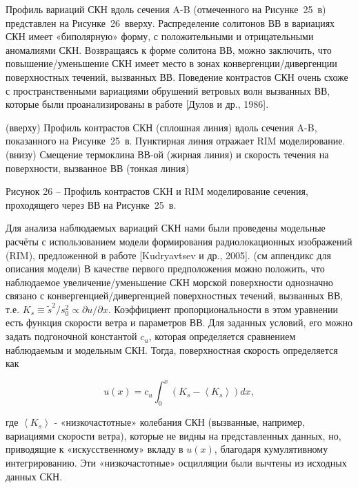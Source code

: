 Профиль вариаций СКН вдоль сечения A-B (отмеченного на Рисунке~25~в) представлен на Рисунке~26~вверху. Распределение солитонов ВВ в вариациях СКН имеет «биполярную» форму, с положительными и отрицательными аномалиями СКН. Возвращаясь к форме солитона ВВ, можно заключить, что повышение/уменьшение СКН имеет место в зонах конвергенции/дивергенции поверхностных течений, вызванных ВВ. Поведение контрастов СКН очень схоже с пространственными вариациями обрушений ветровых волн вызванных ВВ, которые были проанализированы в работе [Дулов и др., 1986].







(вверху) Профиль контрастов СКН (сплошная линия) вдоль сечения A-B, показанного на Рисунке~25~в. Пунктирная линия отражает RIM моделирование. (внизу) Смещение термоклина ВВ-ой (жирная линия) и скорость течения на поверхности, вызванное ВВ (тонкая линия)



Рисунок 26 -- Профиль контрастов СКН и RIM моделирование сечения, проходящего через ВВ на Рисунке~25~в.



Для анализа наблюдаемых вариаций СКН нами были проведены модельные расчёты с использованием модели формирования радиолокационных изображений (RIM), предложенной в работе [Kudryavtsev и др., 2005]. (см аппендикс для описания модели) В качестве первого предположения можно положить, что наблюдаемое увеличение/уменьшение СКН морской поверхности однозначно связано с конвергенцией/дивергенцией поверхностных течений, вызванных ВВ, т.е. $K_{s} \equiv \tilde{s}^{2} /s_{0}^{2} \propto \partial u/\partial x$. Коэффициент пропорциональности в этом уравнении есть функция скорости ветра и параметров ВВ. Для заданных условий, его можно задать подгоночной константой $c_{u} $, которая определяется сравнением наблюдаемым и модельным СКН. Тогда, поверхностная скорость определяется как



\begin{equation} \label{eq:3.1} u(x)=c_{u} \int _{0}^{x}\left(K_{s} -\left\langle K_{s} \right\rangle \right)dx ,  \end{equation} 



\noindent где $\left\langle K_{s} \right\rangle $ - «низкочастотные» колебания СКН (вызванные, например, вариациями скорости ветра), которые не видны на представленных данных, но, приводящие к «искусственному» вкладу в $u(x)$, благодаря кумулятивному интегрированию. Эти «низкочастотные» осцилляции были вычтены из исходных данных СКН.

